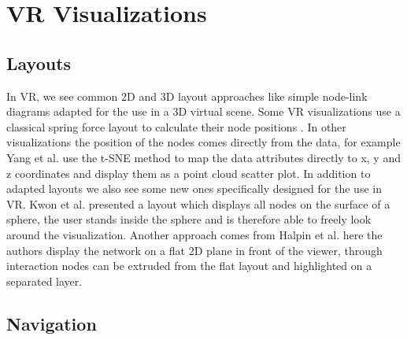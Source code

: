 \section{VR Visualizations}

\subsection{Layouts}

In VR, we see common 2D and 3D layout approaches like simple node-link diagrams adapted for the use in a 3D virtual scene. 
Some VR visualizations use a classical spring force layout to calculate their node positions \cite{drogemuller_examining_2020} \cite{sorger_immersive_2019}.
In other visualizations the position of the nodes comes directly from the data, for example Yang et al. \cite{yang_embodied_2020} use the t-SNE method \cite{maaten_visualizing_2008} to map the data attributes directly to x, y and z coordinates and display them as a point cloud scatter plot.
In addition to adapted layouts we also see some new ones specifically designed for the use in VR. Kwon et al. \cite{kwon_study_2016} presented a layout which displays all nodes on the surface of a sphere, the user stands inside the sphere and is therefore able to freely look around the visualization. Another approach comes from Halpin et al. \cite{halpin_exploring_2008} here the authors display the network on a flat 2D plane in front of the viewer, through interaction nodes can be extruded from the flat layout and highlighted on a separated layer.     

\subsection{Navigation}

